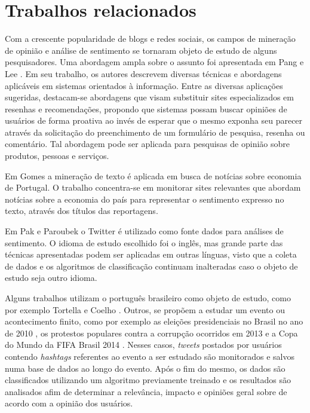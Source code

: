 \chapter{Trabalhos relacionados} \label{cap:trabalhos_relacionados}

Com a crescente popularidade de blogs e redes sociais, os campos de mineração de opinião e análise de sentimento se tornaram objeto de estudo de alguns pesquisadores. Uma abordagem ampla sobre o assunto foi apresentada em Pang e Lee \cite{pang2008opinion}. Em seu trabalho, os autores descrevem diversas técnicas e abordagens aplicáveis em sistemas orientados à informação. Entre as diversas aplicações sugeridas, destacam-se abordagens que visam substituir sites especializados em resenhas e recomendações, propondo que sistemas possam buscar opiniões de usuários de forma proativa ao invés de esperar que o mesmo exponha seu parecer através da solicitação do preenchimento de um formulário de pesquisa, resenha ou comentário. Tal abordagem pode ser aplicada para pesquisas de opinião sobre produtos, pessoas e serviços.

Em Gomes \cite{gomes2013text} a mineração de texto é aplicada em busca de notícias sobre economia de Portugal. O trabalho concentra-se em monitorar sites relevantes que abordam notícias sobre a economia do país para representar o sentimento expresso no texto, através dos títulos das reportagens.

Em Pak e Paroubek \cite{pak2010twitter} o Twitter é utilizado como fonte dados para análises de sentimento. O idioma de estudo escolhido foi o inglês, mas grande parte das técnicas apresentadas podem ser aplicadas em outras línguas, visto que a coleta de dados e os algoritmos de classificação continuam inalteradas caso o objeto de estudo seja outro idioma.

Alguns trabalhos utilizam o português brasileiro como objeto de estudo, como por exemplo Tortella e Coelho \cite{tortellaanalise}. Outros, se propõem a estudar um evento ou acontecimento finito, como por exemplo as eleições presidenciais no Brasil no ano de 2010 \cite{rodrigues2012characterizing}, os protestos populares contra a corrupção ocorridos em 2013 \cite{franca2014analise} e a Copa do Mundo da FIFA Brasil 2014 \cite{carvalho2014mineraccao}. Nesses casos, \textit{tweets} postados por usuários contendo \textit{hashtags} referentes ao evento a ser estudado são monitorados e salvos numa base de dados ao longo do evento. Após o fim do mesmo, os dados são classificados utilizando um algoritmo previamente treinado e os resultados são analisados afim de determinar a relevância, impacto e opiniões geral sobre de acordo com a opinião dos usuários.

